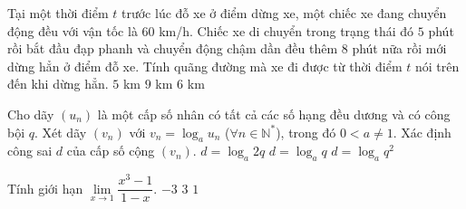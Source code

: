\begin{ex}%
Tại một thời điểm $t$ trước lúc đỗ xe ở điểm dừng xe, một chiếc xe đang chuyển động đều với vận tốc là $60$ km/h. Chiếc xe di chuyển trong trạng thái đó $5$ phút rồi bắt đầu đạp phanh và chuyển động chậm dần đều thêm $8$ phút nữa rồi mới dừng hẳn ở điểm đỗ xe. Tính quãng đường mà xe đi được từ thời điểm $t$ nói trên đến khi dừng hẳn.
{$5$ km}
{\True $9$ km}
{$6$ km}
\end{ex}

\begin{ex}%
Cho dãy $(u_n)$ là một cấp số nhân có tất cả các số hạng đều dương và có công bội $q$. Xét dãy $(v_n)$ với $v_n=\log_au_n$ ($\forall n\in\mathbb{N}^{\ast}$), trong đó $0<a\neq 1$. Xác định công sai $d$ của cấp số cộng $(v_n)$.
{$d=\log_a2q$}
{\True $d=\log_aq$}
{$d=\log_aq^2$}
\end{ex}

\begin{ex}%
Tính giới hạn $\lim\limits_{x\rightarrow 1}\dfrac{x^3-1}{1-x}$.
{\True $-3$}
{$3$}
{$1$}
\end{ex}

